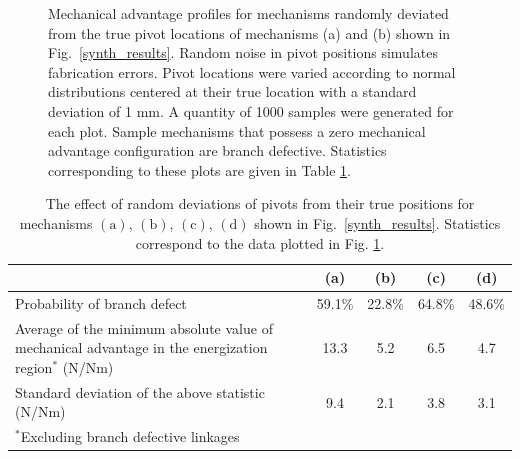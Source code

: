 \documentclass[journal]{IEEEtran}
\begin{document}
\begin{figure}[t]
{		\label{deviatedMAcurves896}}
	\caption{Mechanical advantage profiles for mechanisms randomly deviated from the true pivot locations of mechanisms (a) and (b) shown in Fig.~\ref{synth_results}.  Random noise in pivot positions simulates fabrication errors.  Pivot locations were varied according to normal distributions centered at their true location with a standard deviation of 1 mm.  A quantity of 1000 samples were generated for each plot.  Sample mechanisms that possess a zero mechanical advantage configuration are branch defective.  Statistics corresponding to these plots are given in Table \ref{variation_statistics}.}
	\label{deviatedMAcurves}
\end{figure}

\begin{table}[t]
\caption{The effect of random deviations of pivots from their true positions for mechanisms $\mathrm{(a)}$, $\mathrm{(b)}$, $\mathrm{(c)}$, $\mathrm{(d)}$ shown in Fig.~\ref{synth_results}.  Statistics correspond to the data plotted in Fig. \ref{deviatedMAcurves}.}
\label{variation_statistics}
\centering
\begin{tabular}{|m{35mm}|c|c|c|c|}
\cline{2-5}\multicolumn{1}{l|}{} & (a) & (b) & (c) & (d) \\
\hline
Probability of branch defect & 59.1\% & 22.8\% & 64.8\% & 48.6\% \\
\hline
\multirow{5}[2]{3.5cm}{Average of the minimum absolute value of mechanical advantage in the energization region$^*$ (N/Nm)} &  &  &  &  \\
  &  &  &  &  \\
  & 13.3 & 5.2 & 6.5 & 4.7 \\
  &  &  &  &  \\
  &  &  &  &  \\
\hline
\multirow{3}[2]{3.5cm}{Standard deviation of the above statistic (N/Nm)} &  &  &  &  \\
  & 9.4 & 2.1 & 3.8 & 3.1 \\
  &   &   &   &  \\
\hline
\multicolumn{5}{l}{$^*$Excluding branch defective linkages} \rule{0pt}{3ex}
\end{tabular}
\end{table}
\end{document}
